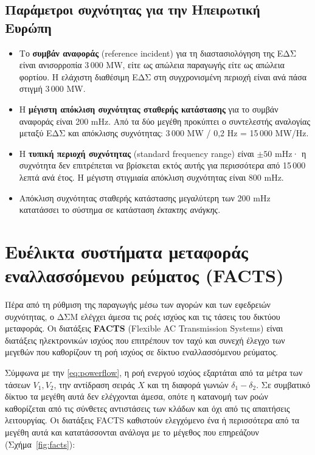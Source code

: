 \subsection{Παράμετροι συχνότητας για την Ηπειρωτική Ευρώπη}

\begin{itemize}
\item Το \textbf{συμβάν αναφοράς} (reference incident) για τη διαστασιολόγηση της ΕΔΣ είναι
      ανισορροπία 3\,000 MW, είτε ως απώλεια παραγωγής είτε ως απώλεια φορτίου. Η ελάχιστη
      διαθέσιμη ΕΔΣ στη συγχρονισμένη περιοχή είναι ανά πάσα στιγμή 3\,000 MW.
\item Η \textbf{μέγιστη απόκλιση συχνότητας σταθερής κατάστασης} για το συμβάν αναφοράς
      είναι 200 mHz. Από τα δύο μεγέθη προκύπτει ο συντελεστής αναλογίας μεταξύ ΕΔΣ και
      απόκλισης συχνότητας: 3\,000 MW / 0,2 Hz = 15\,000 MW/Hz.
\item Η \textbf{τυπική περιοχή συχνότητας} (standard frequency range) είναι $\pm 50$ mHz· η
      συχνότητα δεν επιτρέπεται να βρίσκεται εκτός αυτής για περισσότερα από
      15\,000 λεπτά ανά έτος. Η μέγιστη στιγμιαία απόκλιση συχνότητας είναι 800 mHz.
\item Απόκλιση συχνότητας σταθερής κατάστασης μεγαλύτερη των 200 mHz κατατάσσει το σύστημα
      σε κατάσταση \emph{έκτακτης ανάγκης}.
\end{itemize}

\section{Ευέλικτα συστήματα μεταφοράς εναλλασσόμενου ρεύματος (FACTS)}

Πέρα από τη ρύθμιση της παραγωγής μέσω των αγορών και των εφεδρειών συχνότητας, ο ΔΣΜ
ελέγχει άμεσα τις ροές ισχύος και τις τάσεις του δικτύου μεταφοράς. Οι διατάξεις
\textbf{FACTS} (Flexible AC Transmission Systems) είναι διατάξεις ηλεκτρονικών ισχύος που
επιτρέπουν τον ταχύ και συνεχή έλεγχο των μεγεθών που καθορίζουν τη ροή ισχύος σε δίκτυο
εναλλασσόμενου ρεύματος.

Σύμφωνα με την \eqref{eq:powerflow}, η ροή ενεργού ισχύος εξαρτάται από τα μέτρα των τάσεων
$V_1, V_2$, την αντίδραση σειράς $X$ και τη διαφορά γωνιών $\delta_1 - \delta_2$. Σε
συμβατικό δίκτυο τα μεγέθη αυτά δεν ελέγχονται άμεσα, οπότε η κατανομή των ροών καθορίζεται
από τις σύνθετες αντιστάσεις των κλάδων και όχι από τις απαιτήσεις λειτουργίας. Οι διατάξεις
FACTS καθιστούν ελεγχόμενο ένα ή περισσότερα από τα μεγέθη αυτά και κατατάσσονται ανάλογα με
το μέγεθος που επηρεάζουν (Σχήμα~\ref{fig:facts}):

